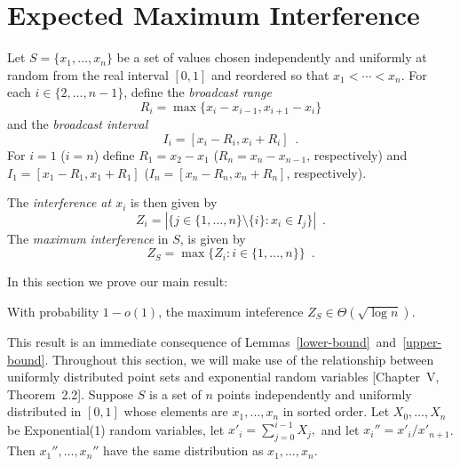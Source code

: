 \documentclass{patmorin}
\begin{document}
%

\section{Expected Maximum Interference}
\label{section3}




Let $S=\{x_1,\ldots,x_n\}$ be a set of values chosen
independently and uniformly at random from the real interval $[0,1]$
and reordered so that $x_1<\cdots<x_n$.  For each
$i\in\{2,\ldots,n-1\}$, define the \emph{broadcast range} 
\[
  R_i = \max\{x_i - x_{i-1}, x_{i+1}-x_i\}
\]
and the \emph{broadcast interval}
\[
  I_i = [x_i-R_i,x_i+R_i] \enspace . \]
For $i=1$ ($i=n$) define $R_1 = x_2 - x_1$ ($R_n = x_n - x_{n-1}$,
  respectively) and $I_1 = [ x_1 - R_1 , x_1 + R_1 ]$ ($I_n = [ x_n - R_n, x_n + R_n]$, respectively).

The \emph{interference at $x_i$} is then given by
\[
  Z_i = |\{j\in\{1,\ldots,n\}\setminus\{i\} : x_i \in I_j\}| \enspace .
\]
The \emph{maximum interference} in $S$, is given by
\[
  Z_S=\max\{Z_i:i\in\{1,\ldots,n\}\} \enspace .
\]


In this section we prove our main result:
\begin{thm}
\label{plm}
With probability $1-o(1)$, the  maximum inteference
$Z_S\in \Theta(\sqrt{\log n})$.
\end{thm}

This result is an immediate consequence of 
Lemmas~\ref{lower-bound}~and~\ref{upper-bound}. 
Throughout this section, we will make use of the relationship between
uniformly distributed point sets and exponential random variables
\cite{d86}[Chapter~V, Theorem~2.2].  Suppose $S$ is a set of $n$ points
independently and uniformly distributed in $[0,1]$ whose elements are
$x_1,\ldots,x_n$ in sorted order.  Let $X_0,\ldots,X_n$ be Exponential(1)
random variables, let 
$x'_i=\sum_{j=0}^{i-1}X_j,$
and let $x_i''=x'_i/x'_{n+1}$.
Then $x_1'',\ldots,x_n''$ have the same distribution as $x_1,\ldots,x_n$.
\end{document}
